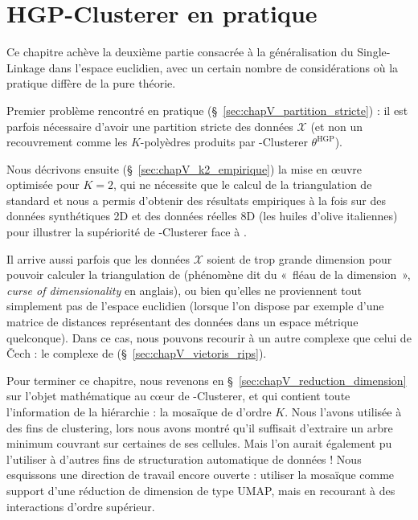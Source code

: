 \chapter{HGP-Clusterer en pratique}
\label{chap:conclusion_partie_II}


Ce chapitre achève la deuxième partie consacrée à la généralisation du Single-Linkage dans l'espace euclidien, avec un certain nombre de considérations où la pratique diffère de la pure théorie.

Premier problème rencontré en pratique (\S~\ref{sec:chapV_partition_stricte}) : il est parfois nécessaire d'avoir une partition stricte des données $\mathcal X$ (et non un recouvrement comme les $K$-polyèdres produits par \HGP-Clusterer $\theta^{\mathrm{HGP}}$).

Nous décrivons ensuite (\S~\ref{sec:chapV_k2_empirique}) la mise en œuvre optimisée pour $K=2$, qui ne nécessite que le calcul de la triangulation de  standard et nous a permis d'obtenir des résultats empiriques à la fois sur des données synthétiques 2D et des données réelles 8D (les huiles d'olive italiennes) pour illustrer la supériorité de \HGP-Clusterer face à \HDBSCAN \cite{BibiAppliedNetworkScience}. 

Il arrive aussi parfois que les données $\mathcal X$ soient de trop grande dimension pour pouvoir calculer la triangulation de  (phénomène dit du «~fléau de la dimension~», \emph{curse of dimensionality} \cite{Pestov2000CurseDimensionality} en anglais), ou bien qu'elles ne proviennent tout simplement pas de l'espace euclidien (lorsque l'on dispose par exemple d'une matrice de distances représentant des données dans un espace métrique quelconque). Dans ce cas, nous pouvons recourir à un autre complexe que celui de \v Cech : le complexe de  (\S~\ref{sec:chapV_vietoris_rips}).

Pour terminer ce chapitre, nous revenons en \S~\ref{sec:chapV_reduction_dimension} sur l'objet mathématique au cœur de \HGP-Clusterer, et qui contient toute l'information de la hiérarchie \KNN : la mosaïque de  d'ordre $K$.
Nous l'avons utilisée à des fins de clustering, lors nous avons montré qu'il suffisait d'extraire un arbre minimum couvrant sur certaines de ses cellules. Mais l'on aurait également pu l'utiliser à d'autres fins de structuration automatique de données !
Nous esquissons une direction de travail encore ouverte : utiliser la mosaïque comme support d'une réduction de dimension de type UMAP, mais en recourant à des interactions d'ordre supérieur.


